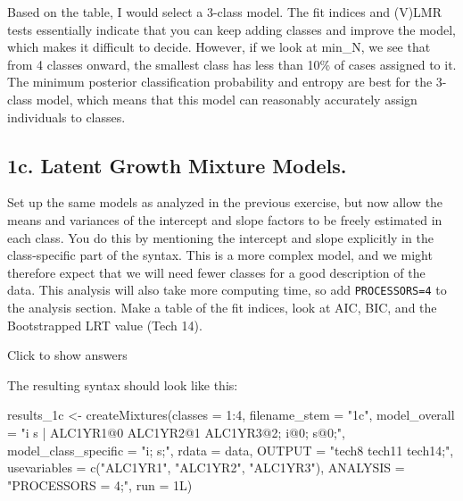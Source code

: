 \documentclass[
]{book}
\newenvironment{Shaded}{\begin{snugshade}}{\end{snugshade}}
\newcommand{\AttributeTok}[1]{\textcolor[rgb]{0.77,0.63,0.00}{#1}}
\newcommand{\DecValTok}[1]{\textcolor[rgb]{0.00,0.00,0.81}{#1}}
\newcommand{\FunctionTok}[1]{\textcolor[rgb]{0.00,0.00,0.00}{#1}}
\newcommand{\NormalTok}[1]{#1}
\newcommand{\OtherTok}[1]{\textcolor[rgb]{0.56,0.35,0.01}{#1}}
\newcommand{\SpecialCharTok}[1]{\textcolor[rgb]{0.00,0.00,0.00}{#1}}
\newcommand{\StringTok}[1]{\textcolor[rgb]{0.31,0.60,0.02}{#1}}
\begin{document}
Based on the table, I would select a 3-class model. The fit indices and (V)LMR tests essentially indicate that you can keep adding classes and improve the model, which makes it difficult to decide. However, if we look at min\_N, we see that from 4 classes onward, the smallest class has less than 10\% of cases assigned to it. The minimum posterior classification probability and entropy are best for the 3-class model, which means that this model can reasonably accurately assign individuals to classes.

\hypertarget{c.-latent-growth-mixture-models.}{%
\subsection{1c. Latent Growth Mixture Models.}\label{c.-latent-growth-mixture-models.}}

Set up the same models as analyzed in the previous exercise, but now allow the means and variances of the intercept and slope factors to be freely estimated in each class. You do this by mentioning the intercept and slope explicitly in the class-specific part of the syntax. This is a more complex model, and we might therefore expect that we will need fewer classes for a good description of the data. This analysis will also take more computing time, so add \texttt{PROCESSORS=4} to the analysis section. Make a table of the fit indices, look at AIC, BIC, and the Bootstrapped LRT value (Tech 14).

Click to show answers

The resulting syntax should look like this:

\begin{Shaded}
\begin{Highlighting}[]
\NormalTok{results\_1c }\OtherTok{\textless{}{-}}
  \FunctionTok{createMixtures}\NormalTok{(}\AttributeTok{classes =} \DecValTok{1}\SpecialCharTok{:}\DecValTok{4}\NormalTok{,}
                 \AttributeTok{filename\_stem =} \StringTok{"1c"}\NormalTok{, }
                 \AttributeTok{model\_overall =} \StringTok{"i s | ALC1YR1@0 ALC1YR2@1 ALC1YR3@2;}
\StringTok{                                  i@0;  s@0;"}\NormalTok{,}
                 \AttributeTok{model\_class\_specific =} \StringTok{"i;  s;"}\NormalTok{,}
                 \AttributeTok{rdata =}\NormalTok{ data,}
                 \AttributeTok{OUTPUT =} \StringTok{"tech8 tech11 tech14;"}\NormalTok{,}
                 \AttributeTok{usevariables =} \FunctionTok{c}\NormalTok{(}\StringTok{"ALC1YR1"}\NormalTok{, }\StringTok{"ALC1YR2"}\NormalTok{, }\StringTok{"ALC1YR3"}\NormalTok{),}
                 \AttributeTok{ANALYSIS =} \StringTok{"PROCESSORS = 4;"}\NormalTok{,}
                 \AttributeTok{run =}\NormalTok{ 1L)}
\end{Highlighting}
\end{Shaded}
\end{document}
